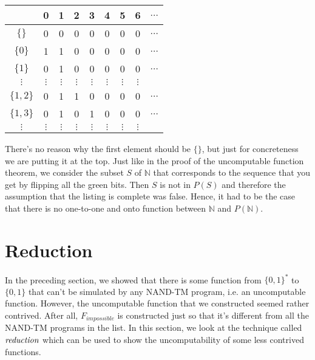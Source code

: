 \documentclass[11pt]{article}
\theoremstyle{definition}
\theoremstyle{remark}
\begin{document}
\begin{center}
    \begin{tabular}{c|cccccccc}
         & 0 & 1 & 2 & 3 & 4 & 5 & 6 & $\dots$ \\ 
        \hline
        $\{ \}$ & \cellcolor{green!20}0 & 0 & 0 & 0 & 0 & 0 & 0 & $\dots$ \\ 
        $\{ 0 \}$ & 1 & \cellcolor{green!20}1 & 0 & 0 & 0 & 0 & 0 & $\dots$ \\ 
        $\{ 1\}$ & 0 & 1 & \cellcolor{green!20}0 & 0 & 0 & 0 & 0 & $\dots$ \\ 
        $\vdots$ & $\vdots$ & $\vdots$ & $\vdots$ & $\vdots$ & $\vdots$ & $\vdots$ & $\vdots$ & \\
        $\{1, 2\}$ & 0 & 1 & 1 & 0 & \cellcolor{green!20}0 & 0 & 0 & $\dots$ \\ 
        $\{1, 3\}$ & 0 & 1 & 0 & 1 & 0 & \cellcolor{green!20}0 & 0 & $\dots$ \\ 
        $\vdots$ & $\vdots$ & $\vdots$ & $\vdots$ & $\vdots$ & $\vdots$ & $\vdots$ & $\vdots$ & 
    \end{tabular}
\end{center}

There's no reason why the first element should be $\{ \}$, but just for concreteness we are putting it at the top. 
Just like in the proof of the uncomputable function theorem, we consider the subset $S$ of $\mathbb{N}$ that corresponds to the
sequence that you get by flipping all the green bits. Then $S$ is not in $P(S)$ and therefore the assumption that the listing is complete
was false. Hence, it had to be the case that there is no one-to-one and onto function between $\mathbb{N}$ and $P(\mathbb{N})$.

\section{Reduction}
In the preceding section, we showed that there is some function from $\{0, 1\}^*$ to $\{0, 1\}$ that can't be simulated by
any NAND-TM program, i.e. an uncomputable function. However, the uncomputable function that we constructed seemed rather contrived.
After all, $F_{impossible}$ is constructed just so that it's different from all the NAND-TM programs in the list. In this section,
we look at the technique called $\emph{reduction}$ which can be used to show the uncomputability of some less contrived functions.
\end{document}
